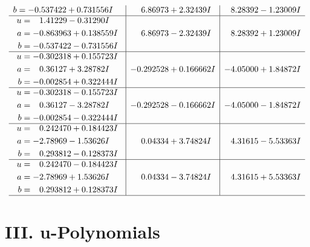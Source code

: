 \documentclass[1p]{elsarticle_modified}
\theoremstyle{definition}
\begin{document}
$$\begin{array}{c|c|c}
\begin{aligned}
b &= -0.537422 + 0.731556 I\end{aligned}
 & \phantom{-}6.86973 + 2.32439 I & \phantom{-}8.28392 - 1.23009 I \\ \hline\begin{aligned}
u &= \phantom{-}1.41229 - 0.31290 I \\
a &= -0.863963 + 0.138559 I \\
b &= -0.537422 - 0.731556 I\end{aligned}
 & \phantom{-}6.86973 - 2.32439 I & \phantom{-}8.28392 + 1.23009 I \\ \hline\begin{aligned}
u &= -0.302318 + 0.155723 I \\
a &= \phantom{-}0.36127 + 3.28782 I \\
b &= -0.002854 + 0.322444 I\end{aligned}
 & -0.292528 + 0.166662 I & -4.05000 + 1.84872 I \\ \hline\begin{aligned}
u &= -0.302318 - 0.155723 I \\
a &= \phantom{-}0.36127 - 3.28782 I \\
b &= -0.002854 - 0.322444 I\end{aligned}
 & -0.292528 - 0.166662 I & -4.05000 - 1.84872 I \\ \hline\begin{aligned}
u &= \phantom{-}0.242470 + 0.184423 I \\
a &= -2.78969 - 1.53626 I \\
b &= \phantom{-}0.293812 - 0.128373 I\end{aligned}
 & \phantom{-}0.04334 + 3.74824 I & \phantom{-}4.31615 - 5.53363 I \\ \hline\begin{aligned}
u &= \phantom{-}0.242470 - 0.184423 I \\
a &= -2.78969 + 1.53626 I \\
b &= \phantom{-}0.293812 + 0.128373 I\end{aligned}
 & \phantom{-}0.04334 - 3.74824 I & \phantom{-}4.31615 + 5.53363 I\\
 \hline 
 \end{array}$$\newpage
\newpage\renewcommand{\arraystretch}{1}
\centering \section*{ III. u-Polynomials}
\end{document}
